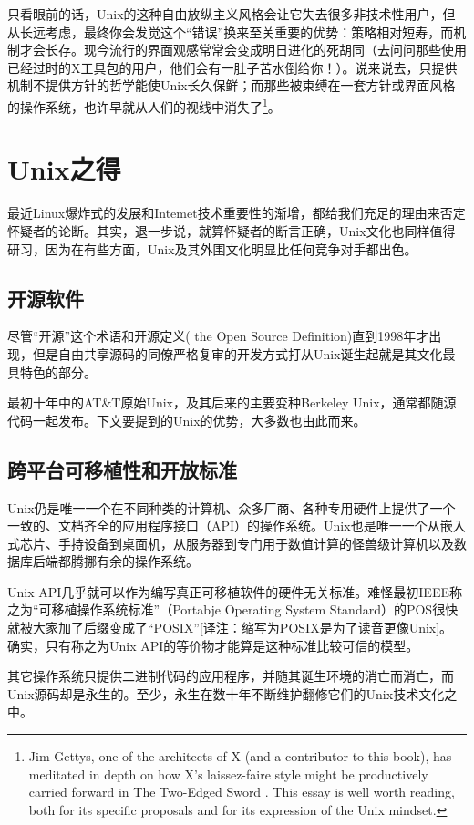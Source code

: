 \documentclass[12pt,oneside]{book}
\begin{document}
\begin{common-format}
只看眼前的话，Unix的这种自由放纵主义风格会让它失去很多非技术性用户，但从长远考虑，最终你会发觉这个“错误”换来至关重要的优势：策略相对短寿，而机制才会长存。现今流行的界面观感常常会变成明日进化的死胡同（去问问那些使用已经过时的X工具包的用户，他们会有一肚子苦水倒给你！）。说来说去，只提供机制不提供方针的哲学能使Unix长久保鲜；而那些被束缚在一套方针或界面风格的操作系统，也许早就从人们的视线中消失了\footnote{Jim Gettys, one of the architects of X (and a contributor to this book), has meditated in depth on how X's laissez-faire style might be productively carried forward in The Two-Edged Sword \cite{Gettys}. This essay is well worth reading, both for its specific proposals and for its expression of the Unix mindset.}。


\section{Unix之得}
最近Linux爆炸式的发展和Intemet技术重要性的渐增，都给我们充足的理由来否定怀疑者的论断。其实，退一步说，就算怀疑者的断言正确，Unix文化也同样值得研习，因为在有些方面，Unix及其外围文化明显比任何竞争对手都出色。

\subsection{开源软件}
尽管“开源”这个术语和开源定义( the Open Source Definition)直到1998年才出现，但是自由共享源码的同僚严格复审的开发方式打从Unix诞生起就是其文化最具特色的部分。

最初十年中的AT\&{}T原始Unix，及其后来的主要变种Berkeley Unix，通常都随源代码一起发布。下文要提到的Unix的优势，大多数也由此而来。

\subsection{跨平台可移植性和开放标准}
Unix仍是唯一一个在不同种类的计算机、众多厂商、各种专用硬件上提供了一个一致的、文档齐全的应用程序接口（API）的操作系统。Unix也是唯一一个从嵌入式芯片、手持设备到桌面机，从服务器到专门用于数值计算的怪兽级计算机以及数据库后端都腾挪有余的操作系统。

Unix API几乎就可以作为编写真正可移植软件的硬件无关标准。难怪最初IEEE称之为“可移植操作系统标准”（Portabje Operating System Standard）的POS很快就被大家加了后缀变成了“POSIX”[译注：缩写为POSIX是为了读音更像Unix]。  确实，只有称之为Unix API的等价物才能算是这种标准比较可信的模型。

其它操作系统只提供二进制代码的应用程序，并随其诞生环境的消亡而消亡，而Unix源码却是永生的。至少，永生在数十年不断维护翻修它们的Unix技术文化之中。


\end{common-format}
\end{document}
